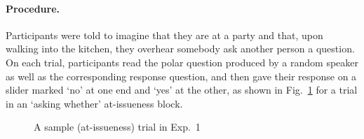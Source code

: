 \documentclass[11pt,fleqn]{article}
\newcommand{\6}{\mbox{$[\hspace*{-.6mm}[$}}
\newcommand{\9}{\mbox{$]\hspace*{-.6mm}]$}}
\newcommand{\figref}[1]{Fig.~\ref{#1}}
\begin{document}
\paragraph{Procedure.} Participants were told to imagine that they are at a party and that, upon walking into the kitchen, they overhear somebody ask another person a question. On each trial, participants read the polar question produced by a random speaker as well as the corresponding response question, and then gave their response on a slider marked `no' at one end and `yes' at the other, as shown in \figref{f-trial-exp1} for a trial in an `asking whether' at-issueness block.  


\begin{figure}[h!]
\begin{center}
\end{center}
\caption{A sample (at-issueness) trial in Exp.~1}\label{f-trial-exp1}
\end{figure}
\end{document}
